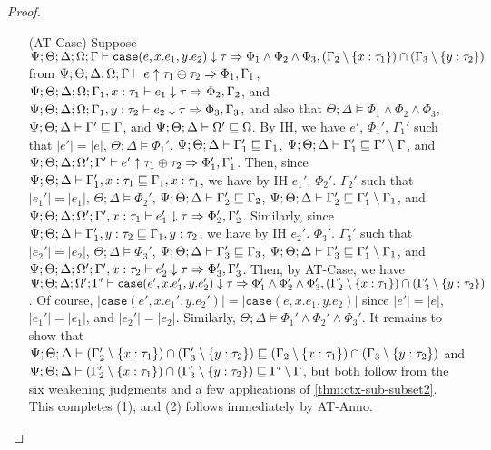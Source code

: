 \begin{proof}
\begin{itemize}
  \item[(AT-Case)] Suppose $\Psi ; \Theta ; \Delta ; \Omega ; \Gamma \vdash \texttt{case}(e,x.e_1,y.e_2) \downarrow \tau \Rightarrow \Phi_1 \wedge \Phi_2 \wedge \Phi_3, (\Gamma_2 \setminus \{x : \tau_1\}) \cap (\Gamma_3 \setminus \{y : \tau_2\})$
  from $\Psi ; \Theta ; \Delta ; \Omega ; \Gamma \vdash e \uparrow \tau_1 \oplus \tau_2 \Rightarrow \Phi_1, \Gamma_1$,
  $\Psi ; \Theta ; \Delta ; \Omega ; \Gamma_1, x: \tau_1 \vdash e_1 \downarrow \tau \Rightarrow \Phi_2,\Gamma_2$, and
  $\Psi ; \Theta ; \Delta ; \Omega ; \Gamma_1, y: \tau_2 \vdash e_2 \downarrow \tau \Rightarrow \Phi_3,\Gamma_3$, and also that
  $\Theta ; \Delta \vDash \Phi_1 \wedge \Phi_2 \wedge \Phi_3$,
  $\Psi ; \Theta ; \Delta \vdash \Gamma' \sqsubseteq \Gamma$, and
  $\Psi ; \Theta ; \Delta \vdash \Omega' \sqsubseteq \Omega$.
  By IH, we have $e'$, $\Phi_1'$, $\Gamma_1'$ such that
  $|e'| = |e|$,
  $\Theta ; \Delta \vDash \Phi_1'$,
  $\Psi ; \Theta ; \Delta \vdash \Gamma_1' \sqsubseteq \Gamma_1$,
  $\Psi ; \Theta ; \Delta \vdash \Gamma_1' \sqsubseteq \Gamma' \setminus \Gamma$, and
  $\Psi ; \Theta ; \Delta ; \Omega' ; \Gamma' \vdash e' \uparrow \tau_1 \oplus \tau_2 \Rightarrow \Phi_1',\Gamma_1'$.
  Then, since $\Psi ; \Theta ; \Delta \vdash \Gamma_1', x : \tau_1 \sqsubseteq \Gamma_1, x : \tau_1$,
  we have by IH $e_1'$. $\Phi_2'$. $\Gamma_2'$ such that
  $|e_1'| = |e_1|$,
  $\Theta  ; \Delta \vDash \Phi_2'$,
  $\Psi ; \Theta ; \Delta \vdash \Gamma_2' \sqsubseteq \Gamma_2$,
  $\Psi ; \Theta ; \Delta \vdash \Gamma_2' \sqsubseteq \Gamma_1' \setminus \Gamma_1$, and
  $\Psi ; \Theta ; \Delta ; \Omega' ; \Gamma', x : \tau_1 \vdash e_1' \downarrow \tau \Rightarrow \Phi_2',\Gamma_2'$.
  Similarly, since $\Psi ; \Theta ; \Delta \vdash \Gamma_1', y : \tau_2 \sqsubseteq \Gamma_1, y : \tau_2$,
  we have by IH $e_2'$. $\Phi_3'$. $\Gamma_3'$ such that
  $|e_2'| = |e_2|$,
  $\Theta  ; \Delta \vDash \Phi_3'$,
  $\Psi ; \Theta ; \Delta \vdash \Gamma_3' \sqsubseteq \Gamma_3$,
  $\Psi ; \Theta ; \Delta \vdash \Gamma_3' \sqsubseteq \Gamma_1' \setminus \Gamma_1$, and
  $\Psi ; \Theta ; \Delta ; \Omega' ; \Gamma', x : \tau_2 \vdash e_2' \downarrow \tau \Rightarrow \Phi_3',\Gamma_3'$.
  Then, by AT-Case, we have
  $\Psi ; \Theta ; \Delta ; \Omega' ; \Gamma' \vdash \texttt{case}(e',x.e_1',y.e_2') \downarrow \tau \Rightarrow \Phi_1' \wedge \Phi_2' \wedge \Phi_3', (\Gamma_2' \setminus \{x : \tau_1\}) \cap (\Gamma_3' \setminus \{y : \tau_2\})$.
  Of course, $|\texttt{case}(e',x.e_1',y.e_2')| = |\texttt{case}(e,x.e_1,y.e_2)|$
  since $|e'| = |e|$, $|e_1'| = |e_1|$, and $|e_2'| = |e_2|$.
  Similarly,
  $\Theta ; \Delta \vDash \Phi_1' \wedge \Phi_2' \wedge \Phi_3'$.
  It remains to show that 
  $\Psi ; \Theta ; \Delta \vdash (\Gamma_2' \setminus \{x : \tau_1\}) \cap (\Gamma_3' \setminus \{y : \tau_2\}) \sqsubseteq (\Gamma_2 \setminus \{x : \tau_1\}) \cap (\Gamma_3 \setminus \{y : \tau_2\})$
  and
  $\Psi ; \Theta ; \Delta \vdash (\Gamma_2' \setminus \{x : \tau_1\}) \cap (\Gamma_3' \setminus \{y : \tau_2\}) \sqsubseteq \Gamma' \setminus \Gamma$,
  but both follow from the six weakening judgments and a few applications of \autoref{thm:ctx-sub-subset2}.
  This completes (1), and (2) follows immediately by AT-Anno.
  

\end{itemize}
\end{proof}
